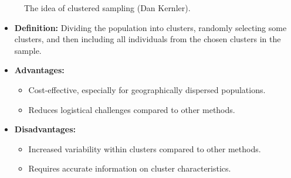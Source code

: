 \documentclass[
  a4paper,
]{scrbook}
\providecommand{\tightlist}{%
  \setlength{\itemsep}{0pt}\setlength{\parskip}{0pt}}\usepackage{longtable,booktabs,array}
\begin{document}
\begin{figure}[H]


\caption{\label{fig-clust-smpl}The idea of clustered sampling (Dan
Kernler).}

\end{figure}%

\begin{itemize}
\item
  \textbf{Definition:} Dividing the population into clusters, randomly
  selecting some clusters, and then including all individuals from the
  chosen clusters in the sample.
\item
  \textbf{Advantages:}

  \begin{itemize}
  \tightlist
  \item
    Cost-effective, especially for geographically dispersed populations.
  \item
    Reduces logistical challenges compared to other methods.
  \end{itemize}
\item
  \textbf{Disadvantages:}

  \begin{itemize}
  \tightlist
  \item
    Increased variability within clusters compared to other methods.
  \item
    Requires accurate information on cluster characteristics.
  \end{itemize}
\end{itemize}
\end{document}
